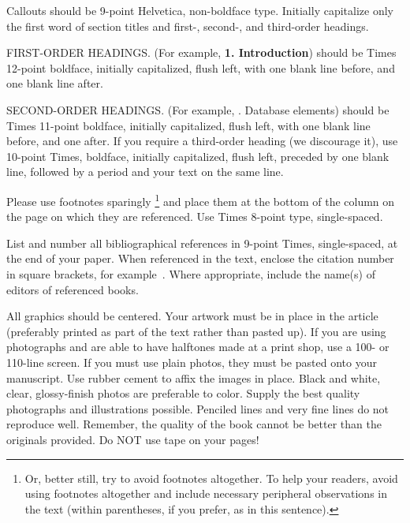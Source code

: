 \documentclass[times, 10pt,twocolumn]{article}
\begin{document}
\noindent Callouts should be 9-point Helvetica, non-boldface type. 
Initially capitalize only the first word of section titles and first-, 
second-, and third-order headings.

FIRST-ORDER HEADINGS. (For example, {\large \bf 1. Introduction}) 
should be Times 12-point boldface, initially capitalized, flush left, 
with one blank line before, and one blank line after.

SECOND-ORDER HEADINGS. (For example, {. Database elements}) 
should be Times 11-point boldface, initially capitalized, flush left, 
with one blank line before, and one after. If you require a third-order 
heading (we discourage it), use 10-point Times, boldface, initially 
capitalized, flush left, preceded by one blank line, followed by a period 
and your text on the same line.


Please use footnotes sparingly%
\footnote
   {%
     Or, better still, try to avoid footnotes altogether.  To help your 
     readers, avoid using footnotes altogether and include necessary 
     peripheral observations in the text (within parentheses, if you 
     prefer, as in this sentence).
   }
and place them at the bottom of the column on the page on which they are 
referenced. Use Times 8-point type, single-spaced.



List and number all bibliographical references in 9-point Times, 
single-spaced, at the end of your paper. When referenced in the text, 
enclose the citation number in square brackets, for example~\cite{ex1}. 
Where appropriate, include the name(s) of editors of referenced books.


All graphics should be centered. Your artwork must be in place in the 
article (preferably printed as part of the text rather than pasted up). 
If you are using photographs and are able to have halftones made at a 
print shop, use a 100- or 110-line screen. If you must use plain photos, 
they must be pasted onto your manuscript. Use rubber cement to affix the 
images in place. Black and white, clear, glossy-finish photos are 
preferable to color. Supply the best quality photographs and 
illustrations possible. Penciled lines and very fine lines do not 
reproduce well. Remember, the quality of the book cannot be better than 
the originals provided. Do NOT use tape on your pages!
\end{document}
